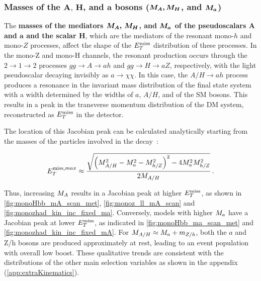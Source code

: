 \subsubsection[Masses of the $A,\,H$, and $a$ bosons ($\mA\,\mH$, and $\ma$)]{Masses of the $\boldsymbol{A,\,H}$, and $\boldsymbol{a}$ bosons ($\boldsymbol{M_{A},M_{H}}$, and $\boldsymbol{M_{a}}$)}

The \textbf{ masses of the mediators $\boldsymbol{M_{A},\,M_{H}}$, and $\boldsymbol{M_{a}}$ of the pseudoscalars $\boldsymbol{A}$ and $\boldsymbol{a}$ and the scalar $\boldsymbol{H}$}, 
which are the mediators of the resonant mono-$h$ and mono-$Z$ processes, affect the shape of the $E_T^\mathrm{miss}$ distribution of these processes. 
In the mono-Z and mono-H channels, the resonant production occurs through the $2\to1\to2$ processes $gg\to A\to a h$ and $gg\to H\to a Z$, respectively, with the light pseudoscalar decaying invisibly as $a\to \chi\chi$. 
In this case, the $A/H \to a h $ process produces a resonance in the invariant mass distribution of the final state system with a width determined by the widths of $a$, $A/H$, and of the SM bosons. 
This results in a peak in the transverse momentum distribution of the DM system, reconstructed as $E_T^\mathrm{miss}$ in the detector.

The location of this Jacobian peak can be calculated analytically starting from the masses of the particles involved in the decay~\cite{Bauer:2017ota}:

\newcommand{\mAH}{\ensuremath{M_{A/H}}\xspace}
\begin{align}
E^{\mathrm{miss},max}_T \approx \frac{\sqrt{\left(\mAH^2 -\ma^2 -M_{h/Z}^2\right)^2 - 4 \ma^2 M_{h/Z}^2}}{2\mAH}\,.
\label{eq:monoH_peak_met}
\end{align}

Thus, increasing $M_{A}$ results in  a Jacobian peak at higher $E_T^\mathrm{miss}$, as shown in \autoref{fig:monoHbb_mA_scan_met}, \autoref{fig:monoz_ll_mA_scan} and \autoref{fig:monozhad_kin_inc_fixed_ma}.
Conversely, models with higher $\ma$ have a Jacobian peak at lower $E_T^\mathrm{miss}$, as indicated in \autoref{fig:monoHbb_ma_scan_met} and \autoref{fig:monozhad_kin_inc_fixed_mA}. 
For $\mAH\approx\ma+m_{Z/h}$, both the $a$ and Z/h bosons are produced approximately at rest, leading to an event population with overall low boost. 
These qualitative trends are consistent with the distributions of the other main selection variables as shown in the appendix (\autoref{app:extraKinematics}).

